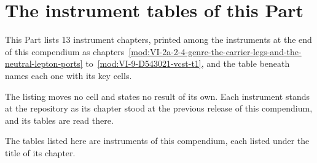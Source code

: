\section{The instrument tables of this Part}\label{mod:VIII-L-the-instrument-tables-at-the-repository}
\begin{chtable}\label{box:VIII-L-the-instrument-tables-at-the-repository:1}
This Part lists 13 instrument chapters, printed among the instruments at the end of this compendium as chapters~\ref{mod:VI-2a-2-4-genre-the-carrier-legs-and-the-neutral-lepton-ports} to~\ref{mod:VI-9-D543021-vcst-t1}, and the table beneath names each one with its key cells.
\end{chtable}
The listing moves no cell and states no result of its own. Each instrument stands at the repository as its chapter stood at the previous release of this compendium, and its tables are read there.
\begin{chbridge}
The tables listed here are instruments of this compendium, each listed under the title of its chapter.
\end{chbridge}
